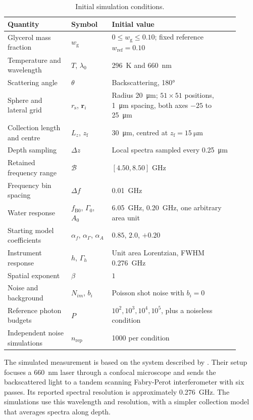 \documentclass[11pt]{article}
\newcommand{\wg}{w_{\mathrm g}}
\begin{document}
\begin{table}[htbp]
\centering\small
\caption{Initial simulation conditions.}
\label{tab:conditions}
\begin{tabular}{@{}p{0.25\linewidth}p{0.16\linewidth}p{0.50\linewidth}@{}}
\toprule \textbf{Quantity} & \textbf{Symbol} & \textbf{Initial value} \\ \midrule
Glycerol mass fraction & $\wg$ & $0\leq\wg\leq0.10$; fixed reference $w_{\mathrm{ref}}=0.10$ \\
Temperature and wavelength & $T$, $\lambda_0$ & \qty{296}{\kelvin} and \qty{660}{\nano\metre} \\
Scattering angle & $\theta$ & Backscattering, \ang{180} \\
Sphere and lateral grid & $r_{\mathrm s}$, $\mathbf r_i$ & Radius \qty{20}{\micro\metre}; $51\times51$ positions, \qty{1}{\micro\metre} spacing, both axes $-25$ to \qty{25}{\micro\metre} \\
Collection length and centre & $L_z$, $z_{\mathrm f}$ & \qty{30}{\micro\metre}, centred at $z_{\mathrm f}=\qty{15}{\micro\metre}$ \\
Depth sampling & $\Delta z$ & Local spectra sampled every \qty{0.25}{\micro\metre} \\
Retained frequency range & $\mathcal B$ & $[4.50,8.50]$ GHz \\
Frequency bin spacing & $\Delta f$ & \qty{0.01}{\giga\hertz} \\
Water response & $f_{\mathrm{B0}}$, $\Gamma_0$, $A_0$ & \qty{6.05}{\giga\hertz}, \qty{0.20}{\giga\hertz}, one arbitrary area unit \\
Starting model coefficients & $\alpha_f$, $\alpha_\Gamma$, $\alpha_A$ & $0.85$, $2.0$, $+0.20$ \\
Instrument response & $h$, $\Gamma_h$ & Unit area Lorentzian, FWHM \qty{0.276}{\giga\hertz} \\
Spatial exponent & $\beta$ & $1$ \\
Noise and background & $N_{im}$, $b_i$ & Poisson shot noise with $b_i=0$ \\
Reference photon budgets & $P$ & $10^2,10^3,10^4,10^5$, plus a noiseless condition \\
Independent noise simulations & $n_{\mathrm{rep}}$ & 1000 per condition \\
\bottomrule
\end{tabular}
\end{table}

The simulated measurement is based on the system described by \citet{mahmodi2024}. Their setup focuses a \qty{660}{\nano\metre} laser through a confocal microscope and sends the backscattered light to a tandem scanning Fabry-Perot interferometer with six passes. Its reported spectral resolution is approximately \qty{0.276}{\giga\hertz}. The simulations use this wavelength and resolution, with a simpler collection model that averages spectra along depth.
\end{document}
